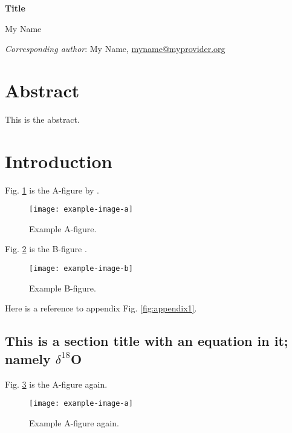 \documentclass[11pt]{article} %
\begin{document}
\thispagestyle{empty} %
\begin{center}

\vspace*{2cm}
\LARGE{\textbf{Title}}\\
\vspace{2cm}

\normalsize
My Name

\end{center}
\vfill
\textit{Corresponding author}: My Name, \href{mailto:me.de}{myname@myprovider.org}

\newpage
{} %

\section*{Abstract}

This is the abstract.

\section{Introduction}

Fig. \ref{fig:a} is the A-figure by \citet{einstein}.

\begin{figure}[H]
\centering\noindent\texttt{[image: example-image-a]}
\caption{Example A-figure.}
\label{fig:a}
\end{figure}

Fig. \ref{fig:b} is the B-figure \citep{einstein}.

\begin{figure}[H]
\centering\noindent\texttt{[image: example-image-b]}
\caption{Example B-figure.}
\label{fig:b}
\end{figure}

Here is a reference to appendix Fig. \ref{fig:appendix1}.

\subsection{This is a section title with an equation in it; namely \texorpdfstring{$\delta^{18}$}{d}O}

Fig. \ref{fig:a2} is the A-figure again.

\begin{figure}[H]
\centering\noindent\texttt{[image: example-image-a]}
\caption{Example A-figure again.}
\label{fig:a2}
\end{figure}
\end{document}
